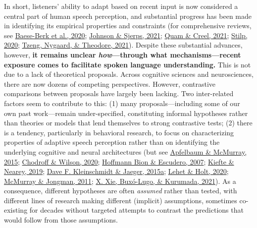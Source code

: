 \documentclass[
  11pt,
  english,
  man,floatsintext]{apa6}
\begin{document}
In short, listeners' ability to adapt based on recent input is now considered a central part of human speech perception, and substantial progress has been made in identifying its empirical properties and constraints (for comprehensive reviews, see \protect\hyperlink{ref-baeseberk2020}{Baese-Berk et al., 2020}; \protect\hyperlink{ref-johnson-sjerps2021}{Johnson \& Sjerps, 2021}; \protect\hyperlink{ref-quam-creel2021}{Quam \& Creel, 2021}; \protect\hyperlink{ref-stilp2020}{Stilp, 2020}; \protect\hyperlink{ref-tzeng2021}{Tzeng, Nygaard, \& Theodore, 2021}). Despite these substantial advances, however, \textbf{it remains unclear \emph{how}---through what mechanisms---recent exposure comes to facilitate spoken language understanding.} This is not due to a lack of theoretical proposals. Across cognitive sciences and neurosciences, there are now dozens of competing perspectives. However, contrastive comparisons between proposals have largely been lacking. Two inter-related factors seem to contribute to this: (1) many proposals---including some of our own past work---remain under-specified, constituting informal hypotheses rather than theories or models that lend themselves to strong contrastive tests; (2) there is a tendency, particularly in behavioral research, to focus on characterizing properties of adaptive speech perception rather than on identifying the underlying cognitive and neural architectures (but see \protect\hyperlink{ref-apfelbaum-mcmurray2015}{Apfelbaum \& McMurray, 2015}; \protect\hyperlink{ref-chodroff-wilson2020}{Chodroff \& Wilson, 2020}; \protect\hyperlink{ref-hoffmanbion-escudero2007}{Hoffmann Bion \& Escudero, 2007}; \protect\hyperlink{ref-kiefte-nearey2019}{Kiefte \& Nearey, 2019}; \protect\hyperlink{ref-kleinschmidt-jaeger2015}{Dave F. Kleinschmidt \& Jaeger, 2015a}; \protect\hyperlink{ref-lehet-holt2020}{Lehet \& Holt, 2020}; \protect\hyperlink{ref-mcmurray-jongman2011}{McMurray \& Jongman, 2011}; \protect\hyperlink{ref-xie2021cognition}{X. Xie, Buxó-Lugo, \& Kurumada, 2021}). As a consequence, different hypotheses are often \emph{assumed} rather than tested, with different lines of research making different (implicit) assumptions, sometimes co-existing for decades without targeted attempts to contrast the predictions that would follow from those assumptions.
\end{document}
